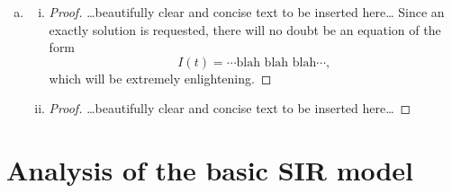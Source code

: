 \documentclass[12pt]{article}
\begin{document}
\begin{enumerate}[(a)]
\item \SIanalQb
  \begin{enumerate}[(i)]
  \item \SIanalQbi
    
    {\color{blue}
      \begin{proof}
        {\color{magenta}\dots beautifully clear and concise text to be inserted here\dots}
        Since an exactly solution is requested, there will no doubt be an equation of the form
        \begin{equation}
          I(t) = \cdots \text{blah blah blah} \cdots ,
        \end{equation}
        which will be extremely enlightening.
      \end{proof}
    }
    
  \item \SIanalQbii
    
    {\color{blue}
      \begin{proof}
        {\color{magenta}\dots beautifully clear and concise text to be inserted here\dots}
      \end{proof}
    }
    
  \end{enumerate}
\end{enumerate}

\section{Analysis of the basic SIR model}
\end{document}
